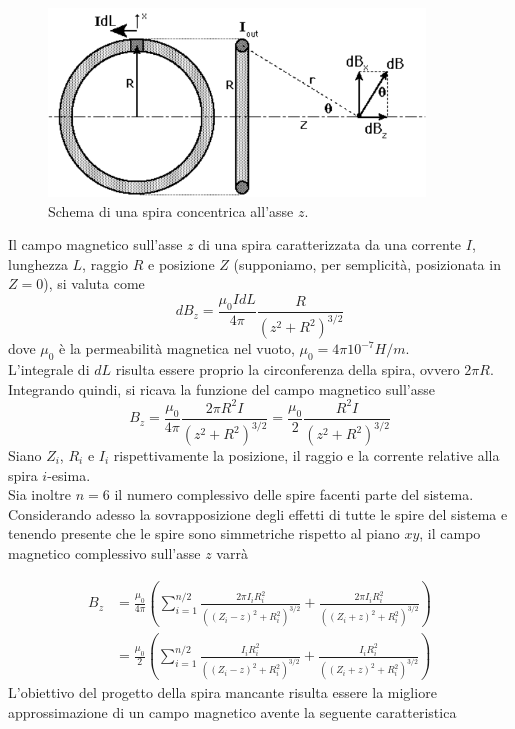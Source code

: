 \documentclass[a4paper, 11pt]{article}
\begin{document}
\begin{figure}[H]
	\centering
	\includegraphics[width=10cm]{assets/figure2}
	\caption{Schema di una spira concentrica all'asse $z$.}
\end{figure}

\noindent
Il campo magnetico sull’asse $z$  di una spira caratterizzata da una corrente
$I$, lunghezza $L$, raggio $R$ e posizione $Z$ (supponiamo, per
semplicità, posizionata in $Z=0$), si valuta come
\[dB_{z}=\frac{\mu_{0}IdL}{4\pi}\frac{R}{\left(z^{2}+R^{2}\right)^{3/2}}\]
dove $\mu_{0}$ è la permeabilità magnetica nel vuoto, $\mu_{0}=4{\pi}10^{-7}
H/m$. \\
L’integrale di $dL$ risulta essere proprio la circonferenza della spira, ovvero
$2{\pi}R$. Integrando quindi, si ricava la funzione del campo magnetico
sull'asse
\[B_{z}=\frac{\mu_{0}}{4\pi}\frac{2{\pi}R^{2}I}{\left(z^{2}+R^{2}\right)^{3/2}}=\frac{\mu_{0}}{2}\frac{R^{2}I}{\left(z^{2}+R^{2}\right)^{3/2}}\]
Siano $Z_{i}$, $R_{i}$ e $I_{i}$ rispettivamente la posizione, il raggio e la
corrente relative alla spira $i$-esima. \\
Sia inoltre $n=6$ il numero complessivo delle spire facenti parte del sistema.
Considerando adesso la sovrapposizione degli effetti di tutte le spire del
sistema e tenendo presente che le spire sono simmetriche rispetto al piano $xy$,
il campo magnetico complessivo sull’asse $z$ varrà

\begin{align*}
	B_{z}
		&=\frac{\mu_{0}}{4{\pi}}\left(\sum_{i=1}^{n/2}\frac{2{\pi}I_{i}R_{i}^{2}}{\left(\left(Z_{i}-z\right)^{2}+R_{i}^{2}\right)^{3/2}}+\frac{2{\pi}I_{i}R_{i}^{2}}{\left(\left(Z_{i}+z\right)^{2}+R_{i}^{2}\right)^{3/2}}\right)\\
		&=\frac{\mu_{0}}{2}\left(\sum_{i=1}^{n/2}\frac{I_{i}R_{i}^{2}}{\left(\left(Z_{i}-z\right)^{2}+R_{i}^{2}\right)^{3/2}}+\frac{I_{i}R_{i}^{2}}{\left(\left(Z_{i}+z\right)^{2}+R_{i}^{2}\right)^{3/2}}\right)
\end{align*}
\noindent
L'obiettivo del progetto della spira mancante risulta essere la migliore
approssimazione di un campo magnetico avente la seguente caratteristica
\end{document}

